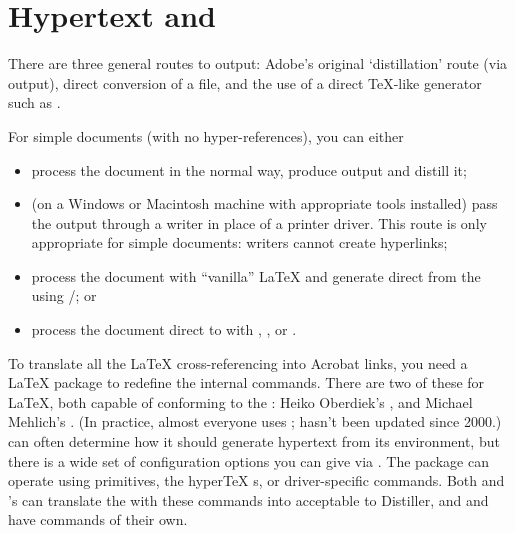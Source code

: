 
\section{Hypertext and }


There are three general routes to  output: Adobe's original
`distillation' route (via \PS{} output), direct conversion of a
 file, and the use of a direct \TeX{}-like 
generator such as .

For simple documents (with no hyper-references), you can either
\begin{itemize}
\item process the document in the normal way, produce \PS{}
  output and distill it;
\item (on a Windows or Macintosh machine with appropriate
  tools installed) pass the output through a writer in place
  of a printer driver.  This route is only appropriate for simple
  documents:  writers cannot create hyperlinks;
\item process the document with ``vanilla'' \LaTeX{} and generate 
  direct from the  using /; or 
\item process the document direct to  with \PDFTeX{},
  , or .
\end{itemize}

To translate all the \LaTeX{} cross-referencing into Acrobat
links, you need a \LaTeX{} package to redefine
the internal commands.  There are two of these for \LaTeX{}, both
capable of conforming to the
:
Heiko Oberdiek's , and Michael Mehlich's
.  (In practice, almost everyone uses
;  hasn't been updated since 2000.)
 can often determine how it should generate
hypertext from its environment, but there is a wide set of
configuration options you can give via .  The package
can operate using \PDFTeX{} primitives, the hyper\TeX{}
s, or  driver-specific  commands.
Both  and \YandY{}'s  can
translate the  with these  commands into
\PS{} acceptable to Distiller, and
 and  have  commands of
their own.

